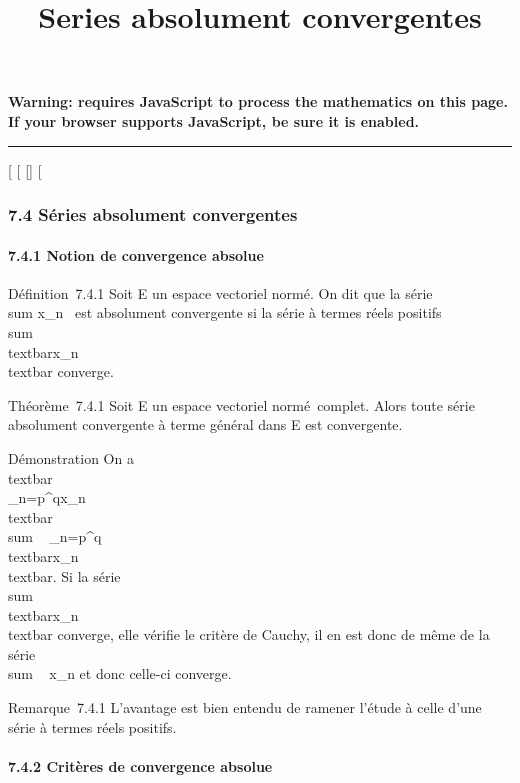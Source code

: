 \documentclass[]{article}
\title{Series absolument convergentes}
\author{}
\date{}
\begin{document}
\maketitle

\textbf{Warning: 
requires JavaScript to process the mathematics on this page.\\ If your
browser supports JavaScript, be sure it is enabled.}

\begin{center}\rule{3in}{0.4pt}\end{center}

{[}
{[}
{[}{]}
{[}

\subsubsection{7.4 Séries absolument convergentes}

\paragraph{7.4.1 Notion de convergence absolue}

Définition~7.4.1 Soit E un espace vectoriel normé. On dit que la série
\\sum  x\_n~ est
absolument convergente si la série à termes réels positifs
\\sum ~
\\textbar{}x\_n\\textbar{}
converge.

Théorème~7.4.1 Soit E un espace vectoriel normé~complet. Alors toute
série absolument convergente à terme général dans E est convergente.

Démonstration On a
\\textbar{}\\\sum
 \_n=p^qx\_n\\textbar{}
\leq\\sum ~
\_n=p^q\\textbar{}x\_n\\textbar{}.
Si la série \\sum ~
\\textbar{}x\_n\\textbar{}
converge, elle vérifie le critère de Cauchy, il en est donc de même de
la série \\sum ~
x\_n et donc celle-ci converge.

Remarque~7.4.1 L'avantage est bien entendu de ramener l'étude à celle
d'une série à termes réels positifs.

\paragraph{7.4.2 Critères de convergence absolue}
\end{document}
